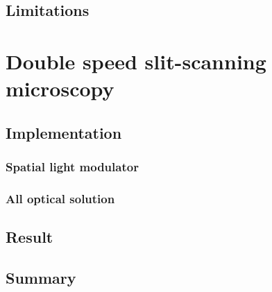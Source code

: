 \subsection{Limitations} %
\section{Double speed slit-scanning microscopy}
\subsection{Implementation} %
\subsubsection{Spatial light modulator} %
\subsubsection{All optical solution} %
\subsection{Result}
\subsection{Summary}
